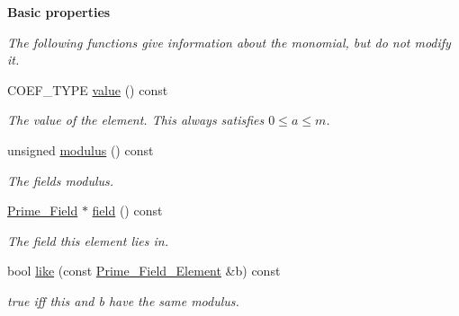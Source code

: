 \begin{Indent}\textbf{ Basic properties}\par
{\em The following functions give information about the monomial, but do not modify it. }\begin{DoxyCompactItemize}
\item 
\mbox{\label{group___fields_group_aa9c68761643afa0b22863904bdfe7e83}} 
C\+O\+E\+F\+\_\+\+T\+Y\+PE \hyperlink{group___fields_group_aa9c68761643afa0b22863904bdfe7e83}{value} () const
\begin{DoxyCompactList}\small\item\em The value of the element. This always satisfies $0\leq a\leq m$. \end{DoxyCompactList}\item 
\mbox{\label{group___fields_group_a4c003344235901132386663a9f28ac1d}} 
unsigned \hyperlink{group___fields_group_a4c003344235901132386663a9f28ac1d}{modulus} () const
\begin{DoxyCompactList}\small\item\em The field\textquotesingle{}s modulus. \end{DoxyCompactList}\item 
\mbox{\label{group___fields_group_af9641451c05d26a2016e21a6ef054c40}} 
\hyperlink{group___fields_group_class_prime___field}{Prime\+\_\+\+Field} $\ast$ \hyperlink{group___fields_group_af9641451c05d26a2016e21a6ef054c40}{field} () const
\begin{DoxyCompactList}\small\item\em The field this element lies in. \end{DoxyCompactList}\item 
\mbox{\label{group___fields_group_a0d75c69f785c122bf9b3b803c22393dc}} 
bool \hyperlink{group___fields_group_a0d75c69f785c122bf9b3b803c22393dc}{like} (const \hyperlink{group___fields_group_class_prime___field___element}{Prime\+\_\+\+Field\+\_\+\+Element} \&b) const
\begin{DoxyCompactList}\small\item\em {\ttfamily true} iff {\ttfamily this} and {\ttfamily b} have the same modulus. \end{DoxyCompactList}\item 
\mbox{\label{group___fields_group_a7e5881bb8b3f94aa8686e38e7ac78d65}} 

\end{DoxyCompactItemize}
\end{Indent}

